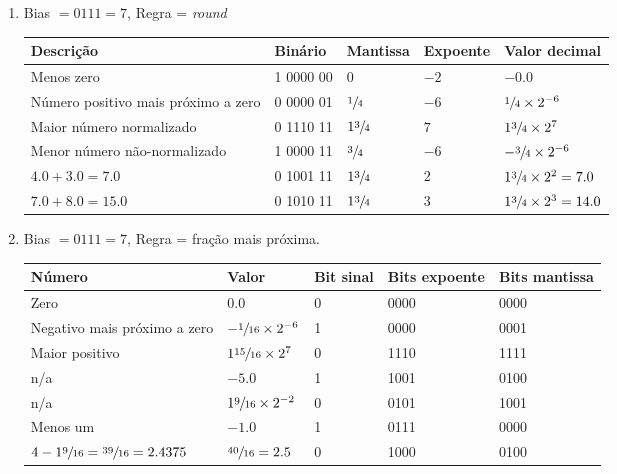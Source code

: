 \begin{enumerate}
    \item Bias $= 0111 = 7$, Regra = {\color{red}\textit{round}}
    \begin{table}[H]
        \begin{tabular}{|l|l|l|l|l|}
            \hline
            \textbf{Descrição}  &
            \textbf{Binário}    &
            \textbf{Mantissa}   &
            \textbf{Expoente}   &
            \textbf{Valor decimal} \\\hline
            Menos zero
            & 1 0000 00 & 0 & $-2$ & $-0.0$
            \\\hline
            Número positivo mais próximo a zero
            & 0 0000 01 & $\sfrac{1}{4}$ & $-6$ & $\sfrac{1}{4}\times 2^{-6}$
            \\\hline
            Maior número normalizado
            & 0 1110 11 & $1\sfrac{3}{4}$ & $7$ & $1\sfrac{3}{4}\times 2^7$
            \\\hline
            Menor número não-normalizado
            & 1 0000 11 & $\sfrac{3}{4}$ & $-6$ & $-\sfrac{3}{4}\times 2^{-6}$
            \\\hline
            $4.0 + 3.0 = 7.0$
            & 0 1001 11 & $1\sfrac{3}{4}$ & $2$ & $1\sfrac{3}{4}\times 2^2 = 7.0$
            \\\hline\rowcolor{red!25}
            $7.0 + 8.0 =  15.0$
            & 0 1010 11 & $1\sfrac{3}{4}$ & $3$ & $1\sfrac{3}{4}\times 2^3 = 14.0$
            \\\hline
        \end{tabular}
    \end{table}

    \item Bias $= 0111 = 7$, Regra = {\color{red}fração mais próxima}.
    \begin{table}[H]
        \begin{tabular}{|l|l|l|l|l|}
            \hline
            \textbf{Número}  &
            \textbf{Valor}    &
            \textbf{Bit sinal}   &
            \textbf{Bits expoente}   &
            \textbf{Bits mantissa} \\\hline
            Zero
            & $0.0$ & 0 & 0000 & 0000
            \\\hline
            Negativo mais próximo a zero
            & $-\sfrac{1}{16}\times 2^{-6}$ & 1 & 0000 & 0001
            \\\hline
            Maior positivo
            & $1\sfrac{15}{16}\times 2^7$ & 0 & 1110 & 1111
            \\\hline
            n/a & $-5.0$
            & 1 & 1001 & 0100
            \\\hline
            n/a & $1\sfrac{9}{16}\times2^{-2}$ 
            & 0 & 0101 & 1001
            \\\hline
            Menos um & $-1.0$
            & 1 & 0111 & 0000
            \\\hline\rowcolor{red!25}
            $4 - 1\sfrac{9}{16} = \sfrac{39}{16} = 2.4375$
            & $\sfrac{40}{16} = 2.5$ & 0 & 1000 & 0100 
            \\\hline
        \end{tabular}
    \end{table}


\end{enumerate}
